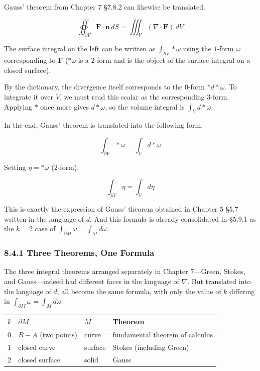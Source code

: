 \documentclass[a4paper,12pt,openany]{book}
\begin{document}
Gauss' theorem from Chapter 7 §7.8.2 can likewise be translated.

\[\oiint_{\partial V} \mathbf{F} \cdot \mathbf{n}\,dS = \iiint_V (\nabla \cdot \mathbf{F})\,dV\]

The surface integral on the left can be written as
\(\int_{\partial V} \ast\omega\) using the \(1\)-form \(\omega\)
corresponding to \(\mathbf{F}\) (\(\ast\omega\) is a \(2\)-form and is
the object of the surface integral on a closed surface).

By the dictionary, the divergence itself corresponds to the \(0\)-form
\(\ast d\ast\omega\). To integrate it over \(V\), we must read this
scalar as the corresponding \(3\)-form. Applying \(\ast\) once more
gives \(d\ast\omega\), so the volume integral is \(\int_V d\ast\omega\).

In the end, Gauss' theorem is translated into the following form.

\[\int_{\partial V} \ast\omega = \int_V d\ast\omega\]

Setting \(\eta = \ast\omega\) (\(2\)-form),

\[\int_{\partial V} \eta = \int_V d\eta\]

This is exactly the expression of Gauss' theorem obtained in Chapter 5
§5.7 written in the language of \(d\). And this formula is already
consolidated in §5.9.1 as the \(k=2\) case of
\(\int_{\partial M}\omega = \int_M d\omega\).

\hypertarget{three-theorems-one-formula}{%
\subsubsection{8.4.1 Three Theorems, One
Formula}\label{three-theorems-one-formula}}

The three integral theorems arranged separately in Chapter 7—Green,
Stokes, and Gauss—indeed had different faces in the language of
\(\nabla\). But translated into the language of \(d\), all become the
same formula, with only the value of \(k\) differing in
\(\int_{\partial M}\omega = \int_M d\omega\).

\begin{longtable}[]{@{}llll@{}}
\toprule\noalign{}
\(k\) & \(\partial M\) & \(M\) & Theorem \\
\midrule\noalign{}
\endhead
\bottomrule\noalign{}
\endlastfoot
\(0\) & \(B-A\) (two points) & curve & fundamental theorem of
calculus \\
\(1\) & closed curve & surface & Stokes (including Green) \\
\(2\) & closed surface & solid & Gauss \\
\end{longtable}
\end{document}
